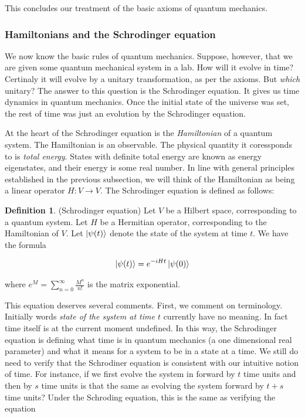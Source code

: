 \documentclass{article}
\theoremstyle{definition}
\newtheorem*{definition}{Definition}
\newcommand{\0}{\left|0\right>}
\newcommand{\1}{\left|1\right>}
\numberwithin{figure}{section}
\begin{document}
This concludes our treatment of the basic axioms of quantum mechanics.

\subsubsection{Hamiltonians and the Schrodinger equation}

We now know the basic rules of quantum mechanics. Suppose, however, that we are given some quantum mechanical system in a lab. How will it evolve in time? Certinaly it will evolve by a unitary transformation, as per the axioms. But \textit{which} unitary? The answer to this question is the Schrodinger equation. It gives us time dynamics in quantum mechanics. Once the initial state of the universe was set, the rest of time was just an evolution by the Schrodinger equation. 

At the heart of the Schrodinger equation is the \textit{Hamiltonian} of a quantum system. The Hamiltonian is an observable. The physical quantity it coressponds to is \textit{total energy}. States with definite total energy are known as energy eigenstates, and their energy is some real number. In line with general principles established in the previous subsection, we will think of the Hamiltonian as being a linear operator $H:V\to V$. The Schrodinger equation is defined as follows:

\begin{definition} (Schrodinger equation) Let $V$ be a Hilbert space, corresponding to a quantum system. Let $H$ be a Hermitian operator, corresponding to the Hamiltonian of $V$. Let $\ket{\psi(t)}$ denote the state of the system at time $t$. We have the formula

$$\ket{\psi(t)}=e^{-i H t}\ket{\psi(0)}$$

where $e^M=\sum_{n=0}^{\infty}\frac{M^n}{n!}$ is the matrix exponential.

\raggedleft\qedsymbol{}
\end{definition}

This equation deserves several comments. First, we comment on terminology. Initially words \textit{state of the system at time $t$} currently have no meaning. In fact time itself is at the current moment undefined. In this way, the Schrodinger equation is defining what time is in quantum mechanics (a one dimensional real parameter) and what it means for a system to be in a state at a time. We still do need to verify that the Schrodiner equation is consistent with our intuitive notion of time. For instance, if we first evolve the system in forward by $t$ time units and then by $s$ time units is that the same as evolving the system forward by $t+s$ time units? Under the Schroding equation, this is the same as verifying the equation
\end{document}

